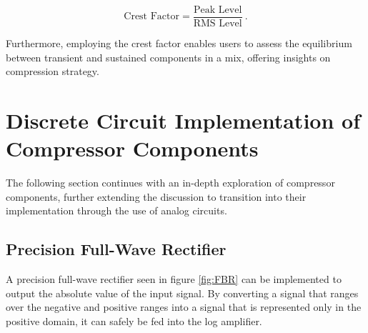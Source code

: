 \documentclass[10pt]{article}
\begin{document}
\begin{multicols*}{2}
                    \begin{equation}
                        \text{Crest Factor} = \frac{\text{Peak Level}}{\text{RMS Level}}\ .
                    \end{equation}

                \noindent Furthermore, employing the crest factor enables users to assess the equilibrium between transient and sustained components in a mix, offering insights on compression strategy.                
            
        \section{Discrete Circuit Implementation of Compressor Components}
            The following section continues with an in-depth exploration of compressor components, further extending the discussion to transition into their implementation through the use of analog circuits.

            \subsection{Precision Full-Wave Rectifier}
                A precision full-wave rectifier seen in figure \ref{fig:FBR} can be implemented to output the absolute value of the input signal. By converting a signal that ranges over the negative and positive ranges into a signal that is represented only in the positive domain, it can safely be fed into the log amplifier.

                                \begin{figure}[!t]
                                    \centering
\end{figure}
\end{multicols*}
\end{document}
